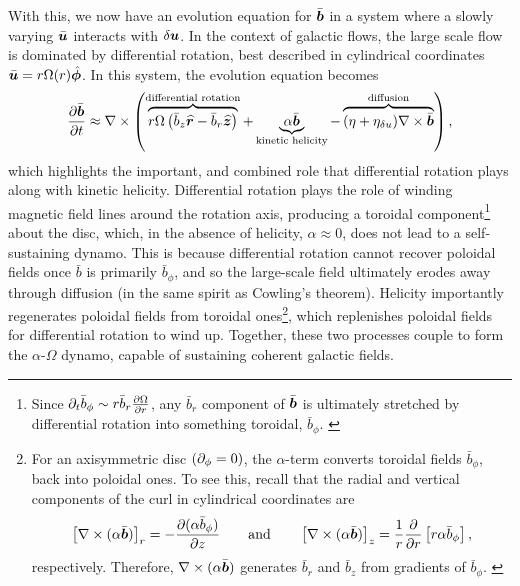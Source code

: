 With this, we now have an evolution equation for $\bar{\bm{b}}$ in a system where a slowly varying $\bar{\bm{u}}$ interacts with $\delta\bm{u}$. In the context of galactic flows, the large scale flow is dominated by differential rotation, best described in cylindrical coordinates $\bar{\bm{u}} = r \Omega(r) \hat{\bm{\phi}}$. In this system, the evolution equation becomes
\begin{align}
    \frac{\partial \bar{\bm{b}}}{\partial t}
        \approx \nabla \times \left( 
            \overbrace{
                r \Omega \left( 
                    \bar{b}_z \widehat{\bm{r}}
                    - \bar{b}_r \widehat{\bm{z}}
                 \right)
            }^\text{differential rotation}
            + \underbrace{
                \alpha \bar{\bm{b}}
            }_\text{kinetic helicity}
            - \overbrace{
                (\eta + \eta_{\delta u}) \nabla \times \bar{\bm{b}}
            }^\text{diffusion}
         \right)
    ,
\end{align}
which highlights the important, and combined role that differential rotation plays along with kinetic helicity. Differential rotation plays the role of winding magnetic field lines around the rotation axis, producing a toroidal component\footnote{
    Since $\partial _t \bar{b}_\phi \sim r \bar{b}_r \frac{\partial \Omega}{\partial r}$, any $\bar{b}_r$ component of $\bar{\bm{b}}$ is ultimately stretched by differential rotation into something toroidal, $\bar{b}_\phi$.
    \label{fnote:lsd:omega}
} about the disc, which, in the absence of helicity, $\alpha \approx 0$, does not lead to a self-sustaining dynamo. This is because differential rotation cannot recover poloidal fields once $\bar{b}$ is primarily $\bar{b}_\phi$, and so the large-scale field ultimately erodes away through diffusion (in the same spirit as Cowling's theorem). Helicity importantly regenerates poloidal fields from toroidal ones\footnote{
    For an axisymmetric disc $(\partial _\phi = 0)$, the $\alpha$-term converts toroidal fields $\bar{b}_\phi$, back into poloidal ones. To see this, recall that the radial and vertical components of the curl in cylindrical coordinates are
    \begin{align}
    \left[ \nabla \times (\alpha\bar{\bm{b}}) \right]_r
        = -\frac{\partial (\alpha \bar{b}_\phi)}{\partial z}
    \qquad\mbox{and}\qquad
    \left[ \nabla \times (\alpha\bar{\bm{b}}) \right]_z
        = \frac{1}{r}\frac{\partial}{\partial r}\left[ r \alpha\bar{b}_\phi \right]
    ,
    \end{align}
    respectively. Therefore, $\nabla \times (\alpha\bar{\bm{b}})$ generates $\bar{b}_r$ and $\bar{b}_z$ from gradients of $\bar{b}_\phi$.
    \label{fnote:lsd:alpha}
}, which replenishes poloidal fields for differential rotation to wind up. Together, these two processes couple to form the $\alpha$-$\Omega$ dynamo, capable of sustaining coherent galactic fields.

